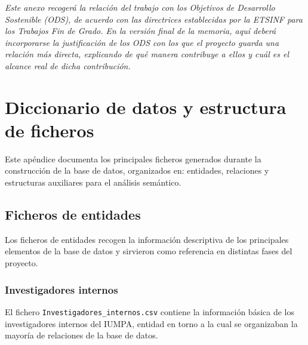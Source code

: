 \documentclass[11pt,spanish,listoffigures,listoftables]{tfgetsinf}
\begin{document}
\textit{Este anexo recogerá la relación del trabajo con los Objetivos de Desarrollo Sostenible (ODS), de acuerdo con las directrices establecidas por la ETSINF para los Trabajos Fin de Grado. En la versión final de la memoria, aquí deberá incorporarse la justificación de los ODS con los que el proyecto guarda una relación más directa, explicando de qué manera contribuye a ellos y cuál es el alcance real de dicha contribución.}


\chapter{Diccionario de datos y estructura de ficheros}
\label{ap:diccionario_datos}

Este apéndice documenta los principales ficheros generados durante la construcción de la base de datos, organizados en: entidades, relaciones y estructuras auxiliares para el análisis semántico.

\section{Ficheros de entidades}

Los ficheros de entidades recogen la información descriptiva de los principales elementos de la base de datos y sirvieron como referencia en distintas fases del proyecto.

\subsection{Investigadores internos}

El fichero \texttt{Investigadores\_internos.csv} contiene la información básica de los investigadores internos del IUMPA, entidad en torno a la cual se organizaban la mayoría de relaciones de la base de datos.
\end{document}
